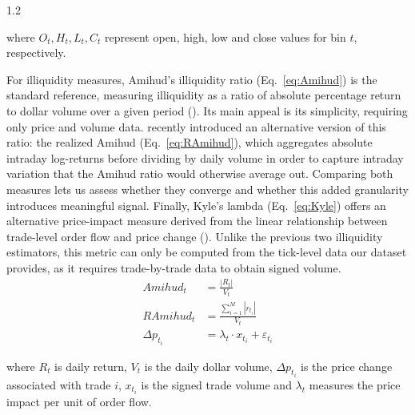 \documentclass[10pt]{article}
\begin{document}
\begin{setstretch}{1.2}
\vspace{0.3cm}

\noindent where $O_t, H_t, L_t, C_t$ represent open, high, low and close values for bin $t$, respectively.

For illiquidity measures, Amihud's illiquidity ratio (Eq.~\ref{eq:Amihud}) is the standard reference, measuring illiquidity as a ratio of absolute percentage return to dollar volume over a given period (\cite{Amihud2002}). Its main appeal is its simplicity, requiring only price and volume data. \textcite{Ranaldo2022} recently introduced an alternative version of this ratio: the realized Amihud (Eq.~\ref{eq:RAmihud}), which aggregates absolute intraday log-returns before dividing by daily volume in order to capture intraday variation that the Amihud ratio would otherwise average out. Comparing both measures lets us assess whether they converge and whether this added granularity introduces meaningful signal. Finally, Kyle's lambda (Eq.~\ref{eq:Kyle}) offers an alternative price-impact measure derived from the linear relationship between trade-level order flow and price change (\cite{Kyle1985}). Unlike the previous two illiquidity estimators, this metric can only be computed from the tick-level data our dataset provides, as it requires trade-by-trade data to obtain signed volume. 
\begin{align}
Amihud_t&=\frac{|R_t|}{V_t}\tag{6} \label{eq:Amihud}\\
RAmihud_t&=\frac{\sum\limits^M_{i=1}|r_{t_i}|}{V_t}\tag{7} \label{eq:RAmihud}\\
\Delta p_{t_i} &= \lambda_t \cdot x_{t_i} + \varepsilon_{t_i} \tag{8} \label{eq:Kyle}
\end{align}

\vspace{0.3cm}

\noindent where $R_t$ is daily return, $V_t$ is the daily dollar volume, $\Delta p_{t_i}$ is the price change associated with trade $i$, $x_{t_i}$ is the signed trade volume and $\lambda_t$ measures the price impact per unit of order flow.


\end{setstretch}
\end{document}
